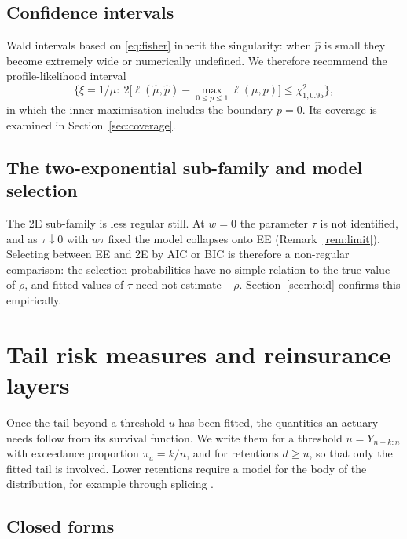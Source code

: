 \documentclass[12pt]{article}
\theoremstyle{definition}
\theoremstyle{remark}
\begin{document}
\subsection{Confidence intervals}

Wald intervals based on \eqref{eq:fisher} inherit the singularity: when $\hat p$ is small they become extremely wide or numerically undefined. We therefore recommend the profile-likelihood interval
\begin{equation}\label{eq:profile}
\Big\{\xi=1/\mu:\ 2\big[\ell(\hat\mu,\hat p)-\max_{0\le p\le1}\ell(\mu,p)\big]\le\chi^2_{1,0.95}\Big\},
\end{equation}
in which the inner maximisation includes the boundary $p=0$. Its coverage is examined in Section~\ref{sec:coverage}.

\subsection{The two-exponential sub-family and model selection}\label{sec:selection}

The 2E sub-family is less regular still. At $w=0$ the parameter $\tau$ is not identified, and as $\tau\downarrow0$ with $w\tau$ fixed the model collapses onto EE (Remark~\ref{rem:limit}). Selecting between EE and 2E by AIC \citep{Akaike1974} or BIC \citep{Schwarz1978} is therefore a non-regular comparison: the selection probabilities have no simple relation to the true value of $\rho$, and fitted values of $\tau$ need not estimate $-\rho$. Section~\ref{sec:rhoid} confirms this empirically.

\section{Tail risk measures and reinsurance layers}\label{sec:risk}

Once the tail beyond a threshold $u$ has been fitted, the quantities an actuary needs follow from its survival function. We write them for a threshold $u=Y_{n-k:n}$ with exceedance proportion $\pi_u=k/n$, and for retentions $d\ge u$, so that only the fitted tail is involved. Lower retentions require a model for the body of the distribution, for example through splicing \citep{Reynkens2017}.

\subsection{Closed forms}
\end{document}
